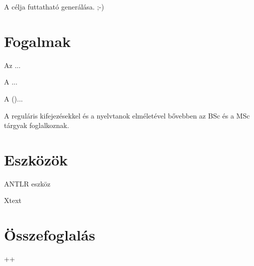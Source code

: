 
A  célja  futtatható  generálása. ;-)

\section{Fogalmak}


\begin{definicio}
	Az  ...
\end{definicio}

\begin{definicio}
	A  ...
\end{definicio}



\begin{definicio}
	A  ()...
\end{definicio}







A reguláris kifejezésekkel és a nyelvtanok elméletével bővebben az \algel BSc és a \nyau MSc tárgyak foglalkoznak.

\section{Eszközök\kieg}

ANTLR eszköz~\cite{Parr:2013:DAR:2501720}

Xtext~\cite{Xtext}

\section{Összefoglalás}

++
